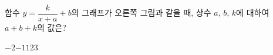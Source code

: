 \noindent\begin{minipage}[t]{0.58\linewidth}\vspace{0pt}\raggedright 함수 $y=\dfrac{k}{x+a}+b$의 그래프가 오른쪽 그림과 같을 때, 상수 $a$, $b$, $k$에 대하여 $a+b+k$의 값은?\end{minipage}\hfill\begin{minipage}[t]{0.4\linewidth}\vspace{0pt}\centering \resizebox{\ifdim\width>\linewidth\linewidth\else\width\fi}{!}{}\end{minipage}\par
\begin{choicesii}{$-2$}{$-1$}{$1$}{$2$}{$3$}\end{choicesii}

